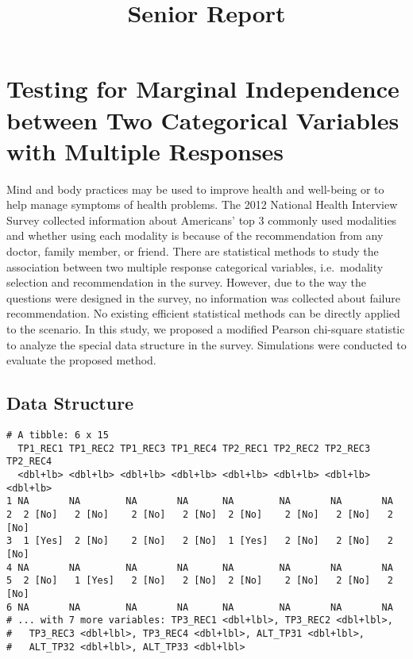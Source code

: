 \documentclass[]{article}
\title{Senior Report}
\author{}
\date{}
\begin{document}
\maketitle

\hypertarget{testing-for-marginal-independence-between-two-categorical-variables-with-multiple-responses}{%
\section{Testing for Marginal Independence between Two Categorical
Variables with Multiple
Responses}\label{testing-for-marginal-independence-between-two-categorical-variables-with-multiple-responses}}

Mind and body practices may be used to improve health and well-being or
to help manage symptoms of health problems. The 2012 National Health
Interview Survey collected information about Americans' top 3 commonly
used modalities and whether using each modality is because of the
recommendation from any doctor, family member, or friend. There are
statistical methods to study the association between two multiple
response categorical variables, i.e.~modality selection and
recommendation in the survey. However, due to the way the questions were
designed in the survey, no information was collected about failure
recommendation. No existing efficient statistical methods can be
directly applied to the scenario. In this study, we proposed a modified
Pearson chi-square statistic to analyze the special data structure in
the survey. Simulations were conducted to evaluate the proposed method.

\hypertarget{data-structure}{%
\subsection{Data Structure}\label{data-structure}}

\begin{verbatim}
# A tibble: 6 x 15
  TP1_REC1 TP1_REC2 TP1_REC3 TP1_REC4 TP2_REC1 TP2_REC2 TP2_REC3 TP2_REC4
  <dbl+lb> <dbl+lb> <dbl+lb> <dbl+lb> <dbl+lb> <dbl+lb> <dbl+lb> <dbl+lb>
1 NA       NA        NA       NA      NA        NA       NA       NA     
2  2 [No]   2 [No]    2 [No]   2 [No]  2 [No]    2 [No]   2 [No]   2 [No]
3  1 [Yes]  2 [No]    2 [No]   2 [No]  1 [Yes]   2 [No]   2 [No]   2 [No]
4 NA       NA        NA       NA      NA        NA       NA       NA     
5  2 [No]   1 [Yes]   2 [No]   2 [No]  2 [No]    2 [No]   2 [No]   2 [No]
6 NA       NA        NA       NA      NA        NA       NA       NA     
# ... with 7 more variables: TP3_REC1 <dbl+lbl>, TP3_REC2 <dbl+lbl>,
#   TP3_REC3 <dbl+lbl>, TP3_REC4 <dbl+lbl>, ALT_TP31 <dbl+lbl>,
#   ALT_TP32 <dbl+lbl>, ALT_TP33 <dbl+lbl>
\end{verbatim}
\end{document}
